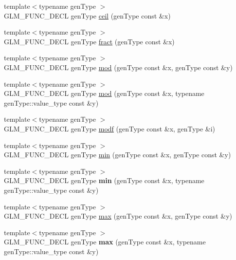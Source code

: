 \begin{DoxyCompactItemize}
\item 
{\footnotesize template$<$typename gen\-Type $>$ }\\G\-L\-M\-\_\-\-F\-U\-N\-C\-\_\-\-D\-E\-C\-L gen\-Type \hyperlink{group__core__func__common_gab81e02fff55c9391e28fa47e68c3c903}{ceil} (gen\-Type const \&x)
\item 
{\footnotesize template$<$typename gen\-Type $>$ }\\G\-L\-M\-\_\-\-F\-U\-N\-C\-\_\-\-D\-E\-C\-L gen\-Type \hyperlink{group__core__func__common_gad04ac2908d032d5518d5f6c8403dbc8b}{fract} (gen\-Type const \&x)
\item 
{\footnotesize template$<$typename gen\-Type $>$ }\\G\-L\-M\-\_\-\-F\-U\-N\-C\-\_\-\-D\-E\-C\-L gen\-Type \hyperlink{group__core__func__common_ga8cc8a75b05125fe1c30de43102ef42e1}{mod} (gen\-Type const \&x, gen\-Type const \&y)
\item 
{\footnotesize template$<$typename gen\-Type $>$ }\\G\-L\-M\-\_\-\-F\-U\-N\-C\-\_\-\-D\-E\-C\-L gen\-Type \hyperlink{group__core__func__common_gad2127c78cb9e89ab462892b11417ded3}{mod} (gen\-Type const \&x, typename gen\-Type\-::value\-\_\-type const \&y)
\item 
{\footnotesize template$<$typename gen\-Type $>$ }\\G\-L\-M\-\_\-\-F\-U\-N\-C\-\_\-\-D\-E\-C\-L gen\-Type \hyperlink{group__core__func__common_gae47da02eb07d660201c09a0df7298a05}{modf} (gen\-Type const \&x, gen\-Type \&i)
\item 
{\footnotesize template$<$typename gen\-Type $>$ }\\G\-L\-M\-\_\-\-F\-U\-N\-C\-\_\-\-D\-E\-C\-L gen\-Type \hyperlink{group__core__func__common_ga3dc90dbd66c9ca1dd5625c93d9c50f02}{min} (gen\-Type const \&x, gen\-Type const \&y)
\item 
\hypertarget{group__core__func__common_gac0f3dec634730c146c121a6517441c9a}{{\footnotesize template$<$typename gen\-Type $>$ }\\G\-L\-M\-\_\-\-F\-U\-N\-C\-\_\-\-D\-E\-C\-L gen\-Type {\bfseries min} (gen\-Type const \&x, typename gen\-Type\-::value\-\_\-type const \&y)}\label{group__core__func__common_gac0f3dec634730c146c121a6517441c9a}

\item 
{\footnotesize template$<$typename gen\-Type $>$ }\\G\-L\-M\-\_\-\-F\-U\-N\-C\-\_\-\-D\-E\-C\-L gen\-Type \hyperlink{group__core__func__common_gaa228561a9da55898f8f72ad2403fafac}{max} (gen\-Type const \&x, gen\-Type const \&y)
\item 
\hypertarget{group__core__func__common_ga30077cf0de58a7474450fb328ba456d7}{{\footnotesize template$<$typename gen\-Type $>$ }\\G\-L\-M\-\_\-\-F\-U\-N\-C\-\_\-\-D\-E\-C\-L gen\-Type {\bfseries max} (gen\-Type const \&x, typename gen\-Type\-::value\-\_\-type const \&y)}\label{group__core__func__common_ga30077cf0de58a7474450fb328ba456d7}


\end{DoxyCompactItemize}
